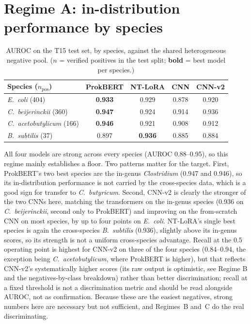 \documentclass{article}
\begin{document}
\section{Regime A: in-distribution performance by species}
\begin{table}[h]
\centering
\caption{AUROC on the T15 test set, by species, against the shared heterogeneous negative pool. ($n$ = verified positives in the test split; \textbf{bold} = best model per species.)}
\begin{tabular}{lcccc}
\toprule
Species ($n_{\text{pos}}$) & ProkBERT & NT-LoRA & CNN & CNN-v2 \\
\midrule
\emph{E.\ coli} (404)              & \textbf{0.933} & 0.929 & 0.878 & 0.920 \\
\emph{C.\ beijerinckii} (360)      & \textbf{0.947} & 0.924 & 0.914 & 0.936 \\
\emph{C.\ acetobutylicum} (166)    & \textbf{0.946} & 0.921 & 0.908 & 0.912 \\
\emph{B.\ subtilis} (37)           & 0.897 & \textbf{0.936} & 0.885 & 0.884 \\
\bottomrule
\end{tabular}
\end{table}

All four models are strong across every species (AUROC 0.88--0.95), so this regime mainly establishes a floor. Two patterns matter for the target. First, ProkBERT's two best species are the in-genus \emph{Clostridium} (0.947 and 0.946), so its in-distribution performance is not carried by the cross-species data, which is a good sign for transfer to \emph{C.\ butyricum}. Second, CNN-v2 is clearly the stronger of the two CNNs here, matching the transformers on the in-genus species (0.936 on \emph{C.\ beijerinckii}, second only to ProkBERT) and improving on the from-scratch CNN on most species, by up to four points on \emph{E.\ coli}. NT-LoRA's single best species is again the cross-species \emph{B.\ subtilis} (0.936), slightly above its in-genus scores, so its strength is not a uniform cross-species advantage. Recall at the 0.5 operating point is highest for CNN-v2 on three of the four species (0.84--0.94, the exception being \emph{C.\ acetobutylicum}, where ProkBERT is higher), but that reflects CNN-v2's systematically higher scores (its raw output is optimistic, see Regime B and the negatives-by-class breakdown) rather than better discrimination; recall at a fixed threshold is not a discrimination metric and should be read alongside AUROC, not as confirmation. Because these are the easiest negatives, strong numbers here are necessary but not sufficient, and Regimes~B and~C do the real discriminating.
\end{document}
